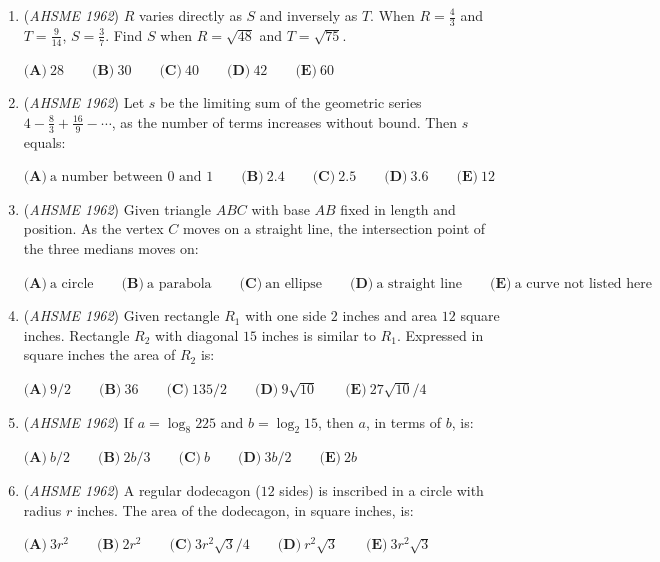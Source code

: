 \begin{enumerate}
	\item (\textit{AHSME 1962}) $R$ varies directly as $S$ and inversely as $T$. When $R = \frac{4}{3}$ and $T = \frac{9}{14}$, $S = \frac{3}{7}$. Find $S$ when $R = \sqrt{48}$ and $T = \sqrt{75}$.


 $\textbf{(A)}\ 28 \qquad  \textbf{(B)}\ 30 \qquad  \textbf{(C)}\ 40 \qquad  \textbf{(D)}\ 42 \qquad  \textbf{(E)}\ 60$


	\item (\textit{AHSME 1962}) Let $s$ be the limiting sum of the geometric series $4 - \frac{8}{3} + \frac{16}{9} - \cdots$, as the number of terms increases without bound. Then $s$ equals:


 $\textbf{(A)}\ \text{a number between } 0 \text{ and } 1 \qquad  \textbf{(B)}\ 2.4 \qquad  \textbf{(C)}\ 2.5 \qquad  \textbf{(D)}\ 3.6 \qquad  \textbf{(E)}\ 12$


	\item (\textit{AHSME 1962}) Given triangle $ABC$ with base $AB$ fixed in length and position. As the vertex $C$ moves on a straight line, the intersection point of the three medians moves on:


 $\textbf{(A)}\ \text{a circle} \qquad  \textbf{(B)}\ \text{a parabola} \qquad  \textbf{(C)}\ \text{an ellipse} \qquad  \textbf{(D)}\ \text{a straight line} \qquad  \textbf{(E)}\ \text{a curve not listed here}$


	\item (\textit{AHSME 1962}) Given rectangle $R_1$ with one side $2$ inches and area $12$ square inches. Rectangle $R_2$ with diagonal $15$ inches is similar to $R_1$. Expressed in square inches the area of $R_2$ is:


 $\textbf{(A)}\ 9/2 \qquad  \textbf{(B)}\ 36 \qquad  \textbf{(C)}\ 135/2 \qquad  \textbf{(D)}\ 9\sqrt{10} \qquad  \textbf{(E)}\ 27\sqrt{10}/4$


	\item (\textit{AHSME 1962}) If $a = \log_8 225$ and $b = \log_2 15$, then $a$, in terms of $b$, is:


 $\textbf{(A)}\ b/2 \qquad  \textbf{(B)}\ 2b/3 \qquad  \textbf{(C)}\ b \qquad  \textbf{(D)}\ 3b/2 \qquad  \textbf{(E)}\ 2b$


	\item (\textit{AHSME 1962}) A regular dodecagon ($12$ sides) is inscribed in a circle with radius $r$ inches. The area of the dodecagon, in square inches, is:


 $\textbf{(A)}\ 3r^2 \qquad  \textbf{(B)}\ 2r^2 \qquad  \textbf{(C)}\ 3r^2\sqrt{3}/4 \qquad  \textbf{(D)}\ r^2\sqrt{3} \qquad  \textbf{(E)}\ 3r^2\sqrt{3}$



\end{enumerate}
